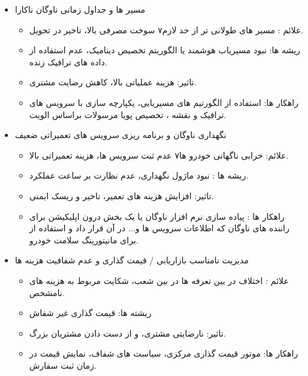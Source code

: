 \documentclass[12pt,a4paper]{report}
\begin{document}
\begin{enumerate}
\begin{itemize}
	\begin{itemize}
		\item علائم : 
عملیات های روزانه نیازمند فرم های فیزیک یا اکسل محور و ورود دوباره این اطلاعات به سیستم است.
		\item ریشه ها :
نبود اتوماسیون ، مقاوت در برابر تغییر.
		\item  تاثیر ها:
خطای انسانی، کندی پردازش، هزینه های نیروی انسانی بالا.
		\item راهکار ها:
	خودکار سازی فرآیندهای تکراری، ایجاد فرم های دیجیتال.
	\end{itemize}
	\item مسیر ها و جداول زمانی  ناوگان ناکارا
	\begin{itemize}
		\item علائم : 
مسیر های طولانی تر از حد لازم۷ سوخت مصرفی بالا، تاخیر در تحویل.
		\item ریشه ها:
نبود مسیریاب هوشمند یا الگوریتم تخصیص دینامیک، عدم استفاده از داده های ترافیک زنده.
		\item تاثیر:
هزینه عملیاتی بالا، کاهش رضایت مشتری.
		\item راهکار ها:
استفاده از الگورتیم های مسیریابی، یکپارچه سازی با سرویس های ترافیک و نقشه ، تخصیص پویا مرسولات براساس الویت.
	\end{itemize}
		\item نگهداری ناوگان و برنامه ریزی سرویس های تعمیراتی ضعیف
	\begin{itemize}
		\item  علائم: 
	خرابی ناگهانی خودرو ها۷ عدم ثبت سرویس ها، هزینه تعمیراتی بالا.
		\item ریشه ها :
	نبود ماژول نگهداری، عدم نظارت بر ساعت عملکرد.
		\item تاثیر: 
افزایش هزینه های تعمیر، تاخیر و ریسک ایمنی.
		\item راهکار ها :
پیاده سازی نرم افزار ناوگان یا یک بخش درون اپلیکیشن برای راننده های ناوگان که اطلاعات سرویس ها و... در آن قرار داد و استفاده از  برای مانیتورینگ سلامت خودرو.
	\end{itemize}
		\item مدیریت نامناسب بازاریابی / قیمت گذاری و عدم شفافیت هزینه ها
	\begin{itemize}
		\item علائم :
اختلاف در بین تعرفه ها در بین شعب، شکایت مربوط به هزینه های نامشخص.
		\item ریشته ها:
قیمت گذاری غیر شفاش
		\item تاثیر: 
نارضایتی  مشتری، و از دست دادن مشتریان بزرگ.
		\item راهکار ها:
موتور قیمت گذاری مرکزی، سیاست های شفاف، نمایش قیمت در زمان ثبت سفارش.

\end{itemize}
\end{itemize}
\end{enumerate}
\end{document}
